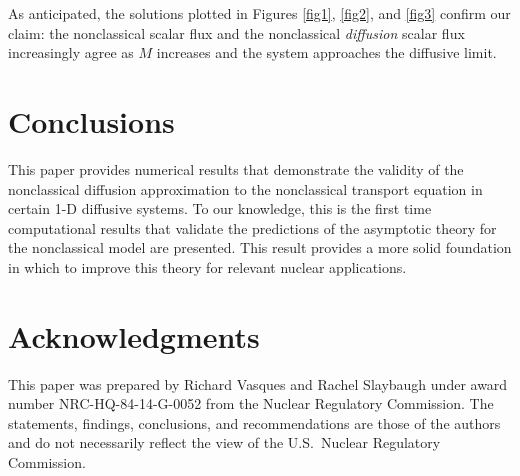 \documentclass{anstrans}
\begin{document}
As anticipated, the solutions plotted in Figures \ref{fig1}, \ref{fig2}, and \ref{fig3} confirm our claim: the nonclassical scalar flux and the nonclassical \textit{diffusion} scalar flux increasingly agree as $M$ increases and the system approaches the diffusive limit.



\section{Conclusions}
This paper provides numerical results that demonstrate the validity of the nonclassical diffusion approximation to the nonclassical transport equation in certain 1-D diffusive systems. To our knowledge, this is the first time computational results that validate the predictions of the asymptotic theory for the nonclassical model are presented. This result provides a more solid foundation 
in which to improve this theory for relevant nuclear applications.

\section{Acknowledgments}
This paper was prepared by Richard Vasques and Rachel Slaybaugh under award number NRC-HQ-84-14-G-0052 from the Nuclear Regulatory Commission. The statements, findings, conclusions, and recommendations are those of the authors and do not necessarily reflect the view of the U.S.\ Nuclear Regulatory Commission.



\end{document}

